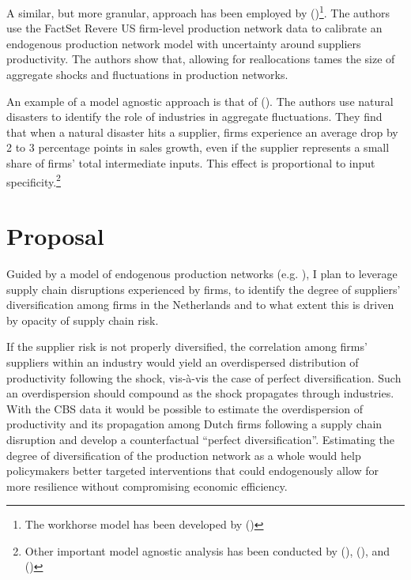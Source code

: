 \documentclass[american, abstract=on]{scrartcl}
\newcommand{\citein}[1]{\citeauthor{#1} (\citeyear{#1})}
\begin{document}
A similar, but more granular, approach has been employed by \citein{mathieu_taschereau-dumouchel_cascades_2020}\footnote{The workhorse model has been developed by \citein{acemoglu_endogenous_2020}}. The authors use the FactSet Revere US firm-level production network data to calibrate an endogenous production network model with uncertainty around suppliers productivity. The authors show that, allowing for reallocations tames the size of aggregate shocks and fluctuations in production networks. 

An example of a model agnostic approach is that of \citein{barrot_input_2016}. The authors use natural disasters to identify the role of industries in aggregate fluctuations. They find that when a natural disaster hits a supplier, firms experience an average drop by 2 to 3 percentage points in sales growth, even if the supplier represents a small share of firms' total intermediate inputs. This effect is proportional to input specificity.\footnote{Other important model agnostic analysis has been conducted by \citein{luttmer_selection_2007}, \citein{atalay_network_2011}, and \citein{mackay_how_2020}}

\section{Proposal}

Guided by a model of endogenous production networks (e.g. \cite{kopytov_endogenous_2021,elliott_supply_2022}), I plan to leverage supply chain disruptions experienced by firms, to identify the degree of suppliers' diversification among firms in the Netherlands and to what extent this is driven by opacity of supply chain risk. 

If the supplier risk is not properly diversified, the correlation among firms' suppliers within an industry would yield an overdispersed distribution of productivity following the shock, vis-à-vis the case of perfect diversification. Such an overdispersion should compound as the shock propagates through industries. With the CBS data it would be possible to estimate the overdispersion of productivity and its propagation among Dutch firms following a supply chain disruption and develop a counterfactual ``perfect diversification''. Estimating the degree of diversification of the production network as a whole would help policymakers better targeted interventions that could endogenously allow for more resilience without compromising economic efficiency.

\newpage
\printbibliography
\end{document}
